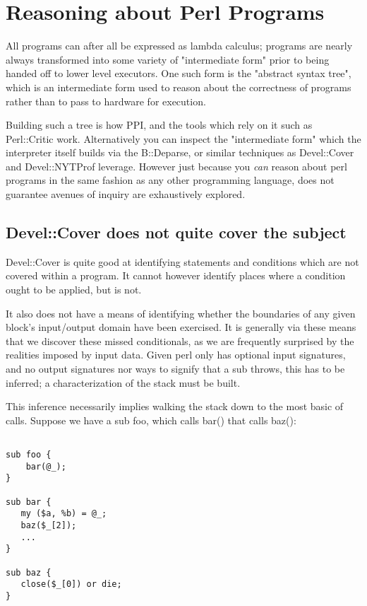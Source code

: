 \documentclass{article}
\begin{document}
\section{Reasoning about Perl Programs}

All programs can after all be expressed as lambda calculus; programs are nearly always transformed into some variety of "intermediate form" prior to being handed off to lower level executors.
One such form is the "abstract syntax tree", which is an intermediate form used to reason about the correctness of programs rather than to pass to hardware for execution.

Building such a tree is how PPI, and the tools which rely on it such as Perl::Critic work.
Alternatively you can inspect the "intermediate form" which the interpreter itself builds via the B::Deparse, or similar techniques as Devel::Cover and Devel::NYTProf leverage.
However just because you \textit{can} reason about perl programs in the same fashion as any other programming language, does not guarantee avenues of inquiry are exhaustively explored.

\subsection{Devel::Cover does not quite cover the subject}

Devel::Cover is quite good at identifying statements and conditions which are not covered within a program.
It cannot however identify places where a condition ought to be applied, but is not.

It also does not have a means of identifying whether the boundaries of any given block's input/output domain have been exercised.
It is generally via these means that we discover these missed conditionals, as we are frequently surprised by the realities imposed by input data.
Given perl only has optional input signatures, and no output signatures nor ways to signify that a sub throws, this has to be inferred; a characterization of the stack must be built.

This inference necessarily implies walking the stack down to the most basic of calls.
Suppose we have a sub foo, which calls bar() that calls baz():

\begin{lstlisting}

sub foo {
    bar(@_);
}

sub bar {
   my ($a, %b) = @_;
   baz($_[2]);
   ...
}

sub baz {
   close($_[0]) or die;
}

\end{lstlisting}
\end{document}
